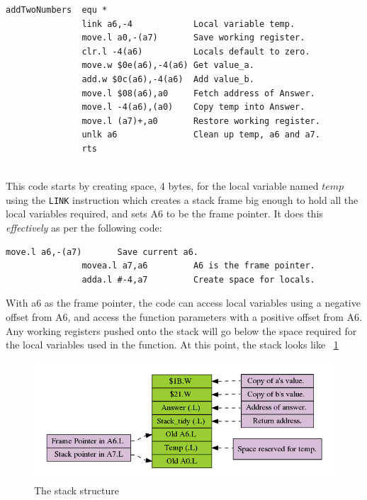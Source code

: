 \begin{lstlisting}[firstnumber=16,caption={Contrived Assembly Code - AddTwoNumbers}]
addTwoNumbers  equ *
               link a6,-4            Local variable temp.
               move.l a0,-(a7)       Save working register.
               clr.l -4(a6)          Locals default to zero.
               move.w $0e(a6),-4(a6) Get value_a.
               add.w $0c(a6),-4(a6)  Add value_b.
               move.l $08(a6),a0     Fetch address of Answer.
               move.l -4(a6),(a0)    Copy temp into Answer.
               move.l (a7)+,a0       Restore working register.
               unlk a6               Clean up temp, a6 and a7.
               rts
              
\end{lstlisting}


This code starts by creating space, 4 bytes, for the local variable named $temp$ using the \texttt{LINK} instruction which creates a stack frame big enough to hold all the local variables required, and sets A6 to be the frame pointer. It does this \emph{effectively} as per the following code:

\begin{lstlisting}[firstnumber=1,caption={LINK Effective Code}]
               move.l a6,-(a7)       Save current a6.
               movea.l a7,a6         A6 is the frame pointer.
               adda.l #-4,a7         Create space for locals.
\end{lstlisting}

With a6 as the frame pointer, the code can access local variables using a negative offset from A6, and access the function parameters with a positive offset from A6. Any working registers pushed onto the stack will go below the space required for the local variables used in the function. At this point, the stack looks like \figurename~\ref{fig:StackFrame}


\begin{figure}[h]
\begin{center}
\includegraphics[scale=0.4]{images/stack.png}
\end{center}
\caption{The stack structure}
\label{fig:StackFrame}
\end{figure}
 

